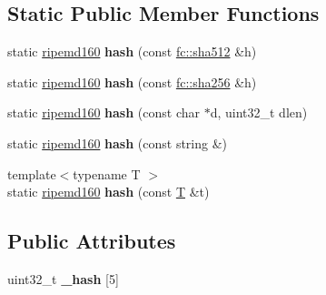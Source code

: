 \subsection*{Static Public Member Functions}
\begin{DoxyCompactItemize}
\item 
\mbox{\label{classfc_1_1ripemd160_a7d43ada80e62a7a73ca472365138f863}} 
static \mbox{\hyperlink{classfc_1_1ripemd160}{ripemd160}} {\bfseries hash} (const \mbox{\hyperlink{classfc_1_1sha512}{fc\+::sha512}} \&h)
\item 
\mbox{\label{classfc_1_1ripemd160_a9f1851cbd437458dc4752d5e81d818e4}} 
static \mbox{\hyperlink{classfc_1_1ripemd160}{ripemd160}} {\bfseries hash} (const \mbox{\hyperlink{classfc_1_1sha256}{fc\+::sha256}} \&h)
\item 
\mbox{\label{classfc_1_1ripemd160_ae724e52158d78c76d86897c0adc9d28b}} 
static \mbox{\hyperlink{classfc_1_1ripemd160}{ripemd160}} {\bfseries hash} (const char $\ast$d, uint32\+\_\+t dlen)
\item 
\mbox{\label{classfc_1_1ripemd160_a6d82c9d0104ad7131aa0d1078059cb69}} 
static \mbox{\hyperlink{classfc_1_1ripemd160}{ripemd160}} {\bfseries hash} (const string \&)
\item 
\mbox{\label{classfc_1_1ripemd160_a0b3145328b23dedde9c34cd44bd99454}} 
{\footnotesize template$<$typename T $>$ }\\static \mbox{\hyperlink{classfc_1_1ripemd160}{ripemd160}} {\bfseries hash} (const \mbox{\hyperlink{struct_t}{T}} \&t)
\end{DoxyCompactItemize}
\subsection*{Public Attributes}
\begin{DoxyCompactItemize}
\item 
\mbox{\label{classfc_1_1ripemd160_a67956103e03592e90d20654798c44f28}} 
uint32\+\_\+t {\bfseries \+\_\+hash} \mbox{[}5\mbox{]}
\end{DoxyCompactItemize}
